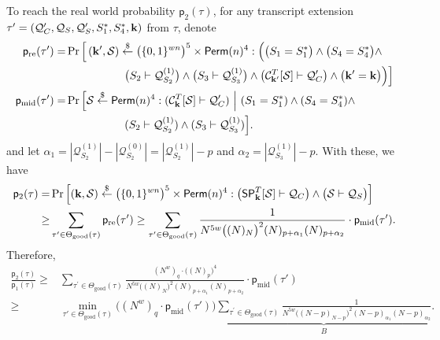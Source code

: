 To reach the real world probability $\mathsf{p}_2(\tau)$, for any transcript extension $\tau'=(\mathcal{Q}_{C}',\mathcal{Q}_{S},\mathcal{Q}_{S}',S_1^*,S_4^*,\mathbf{k})$ from $\tau$, denote            {\small
%
%
\begin{align}
\mathsf{p}_{\mathrm{re}}(\tau') = & \operatorname{Pr}\Big[\left(\mathbf{k}',\mathcal{S}\right) \stackrel{\$}{\leftarrow} \big(\{0,1\}^{wn}\big)^5 \times \mathsf{Perm}(n)^4:
\Big(\big(S_1=S_1^*\big)\wedge\big(S_4=S_4^*\big)\wedge		\notag 	\\
&\ \ \ \ \ \ \ \ \ \ \ \ \ \ \ \ \big(S_2\vdash\mathcal{Q}_{S_2}^{(1)}\big)\wedge\big(S_3\vdash\mathcal{Q}_{S_3}^{(1)}\big)\wedge\big(\mathcal{C}_{\mathbf{k}'}^T[\mathcal{S}] \vdash \mathcal{Q}_C'\big)\wedge\big(\mathbf{k}'=\mathbf{k}\big)\Big)\Big]	 	\notag 	\\
\mathsf{p}_{\mathrm{mid}}(\tau') = & \operatorname{Pr}\Big[\mathcal{S} \stackrel{\$}{\leftarrow}\mathsf{Perm}(n)^4:(\mathcal{C}_{\mathbf{k}}^T[\mathcal{S}] \vdash \mathcal{Q}_C')~\Big|~
(S_1=S_1^*)\wedge (S_4=S_4^*)\wedge	 	\notag 	\\
&\ \ \ \ \ \ \ \ \ \ \ \ \ \ \ \  (S_2\vdash\mathcal{Q}_{S_2}^{(1)})\wedge (S_3\vdash\mathcal{Q}_{S_3}^{(1)})\Big].	 	\notag 	
\end{align}
}%
%
%
and let $\alpha_1=|\mathcal{Q}_{S_2}^{(1)}|-|\mathcal{Q}_{S_2}^{(0)}|=|\mathcal{Q}_{S_2}^{(1)}|-p$ and $\alpha_2=|\mathcal{Q}_{S_3}^{(1)}|-p$. With these, we have
%
%
\begin{align*}
\mathsf{p}_2(\tau)=&\operatorname{Pr}\left[\left(\mathbf{k},\mathcal{S}\right) \stackrel{\$}{\leftarrow} \big(\{0,1\}^{wn}\big)^5 \times \mathsf{Perm}(n)^4:\big(\spn_{\bfk}^{T}[\mathcal{S}] \vdash \mathcal{Q}_{C}\big) \wedge \big(\mathcal{S} \vdash \mathcal{Q}_{S}\big)\right]		\\
\geq & \sum_{\tau^{\prime} \in \Theta_{\mathrm{good}}(\tau)} \mathsf{p}_{\mathrm{re}}(\tau')  
\geq
\sum_{\tau^{\prime} \in \Theta_{\mathrm{good}}(\tau)}
%
\frac{1}{N^{5w}\big((N)_{N}\big)^2(N)_{p+\alpha_1}(N)_{p+\alpha_2}}\cdot \mathsf{p}_{\mathrm{mid}}(\tau')  .
\end{align*}
%
%
Therefore,
%
%
\begin{align*}
\frac{\mathsf{p}_{2}(\tau)}{\mathsf{p}_{1}(\tau)}   \geq  &
\sum_{\tau^{\prime} \in \Theta_{\mathrm{good}}(\tau)}
\frac{(N^w)_q\cdot\big((N)_p\big)^4}{N^{5w}\big((N)_{N}\big)^2(N)_{p+\alpha_1}(N)_{p+\alpha_2}}\cdot \mathsf{p}_{\mathrm{mid}}(\tau')         \\
\geq  &    \min_{\tau' \in \Theta_{\mathrm{good}}(\tau)}\big((N^w)_q\cdot\mathsf{p}_{\mathrm{mid}}(\tau')\big)
\underbrace{\sum_{\tau^{\prime} \in \Theta_{\mathrm{good}}(\tau)}
\frac{1}{N^{5w}\big((N-p)_{N-p}\big)^2(N-p)_{\alpha_1}(N-p)_{\alpha_2}}}_{B} .
\end{align*}



